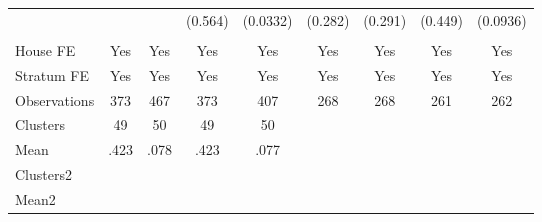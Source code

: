 {\begin{tabular}{l*{8}{c}}
                &         &         &  (0.564)& (0.0332)&  (0.282)&  (0.291)&  (0.449)& (0.0936)\\
                &         &         &         &         &         &         &         &         \\
House FE        &      Yes&      Yes&      Yes&      Yes&      Yes&      Yes&      Yes&      Yes\\
Stratum FE      &      Yes&      Yes&      Yes&      Yes&      Yes&      Yes&      Yes&      Yes\\
\midrule
Observations    &      373&      467&      373&      407&      268&      268&      261&      262\\
Clusters        &       49&       50&       49&       50&         &         &         &         \\
Mean            &     .423&     .078&     .423&     .077&         &         &         &         \\
Clusters2       &         &         &         &         &         &         &         &         \\
Mean2           &         &         &         &         &         &         &         &         \\
\bottomrule
\end{tabular}
}
